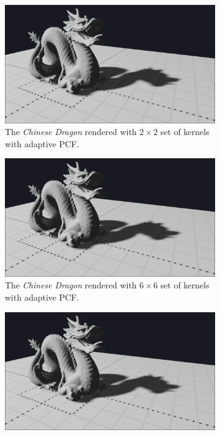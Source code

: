 \begin{figure}[h]
    \centering
    \begin{subfigure}[t]{0.45\textwidth}
		\centering
        \includegraphics[width=\textwidth]{./graf/tests/adaptive/cropped/dragon_adaptive_fhd_1024_2x2_8x8_offset5.png}
        \caption{The \textit{Chinese Dragon} rendered with \(2\times 2\) set of kernels with adaptive PCF.}
    \end{subfigure}
	\hfill
    \begin{subfigure}[t]{0.45\textwidth}
		\centering
        \includegraphics[width=\textwidth]{./graf/tests/adaptive/cropped/dragon_adaptive_fhd_1024_6x6_8x8_offset5.png}
        \caption{The \textit{Chinese Dragon} rendered with \(6\times 6\) set of kernels with adaptive PCF.}
    \end{subfigure}
    \begin{subfigure}[t]{0.45\textwidth}
		\centering
        \includegraphics[width=\textwidth]{./graf/tests/adaptive/cropped/dragon_adaptive_fhd_1024_14x14_8x8_offset5.png}

\end{subfigure}
\end{figure}
